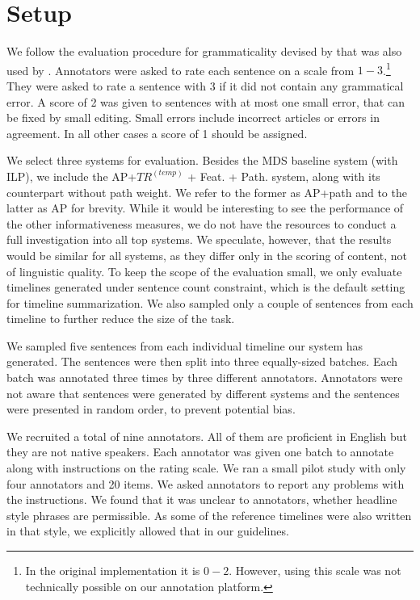 \documentclass[a4paper,BCOR=10mm]{report}
\numberwithin{lemma}{chapter}
\numberwithin{definition}{chapter}
\begin{document}
\section{Setup}

We follow the evaluation procedure for grammaticality devised by \citet{barzilay+mckeown} that was also used by \citet{filippova}.
Annotators were asked to rate each sentence on a scale from $1-3$.\footnote{In the original implementation it is $0-2$. However, using this scale was not technically possible on our annotation platform.} They were asked to rate a sentence with 3 if it did not contain any grammatical error. A score of 2 was given to sentences with at most one small error, that can be fixed by small editing. Small errors include incorrect articles or errors in agreement. In all other cases a score of 1 should be assigned.

We select three systems for evaluation. Besides the MDS baseline system (with ILP), we include the AP+$TR^{(temp)}$ + Feat. + Path. system, along with its counterpart without path weight. We refer to the former as AP+path and to the latter as AP for brevity. While it would be interesting to see the performance of the other informativeness measures, we do not have the resources to conduct a full investigation into all top systems.
We speculate, however, that the results would be similar for all systems, as they differ only in the scoring of content, not of linguistic quality.
To keep the scope of the evaluation small, we only evaluate timelines generated under sentence count constraint, which is the default setting for timeline summarization. We also sampled only a couple of sentences from each timeline to further reduce the size of the task.

We sampled five sentences from each individual timeline our system has generated.
The sentences were then split into three equally-sized batches. Each batch was annotated three times by three different annotators.
Annotators were not aware that sentences were generated by different systems and the sentences were presented in random order, to prevent potential bias.

We recruited a total of nine annotators. All of them are proficient in English but they are not native speakers.
Each annotator was given one batch to annotate along with instructions on the rating scale. We ran a small pilot study with only four annotators and 20 items. We asked annotators to report any problems with the instructions. We found that it was unclear to annotators, whether headline style phrases are permissible.
As some of the reference timelines were also written in that style, we explicitly allowed that in our guidelines.
\end{document}
